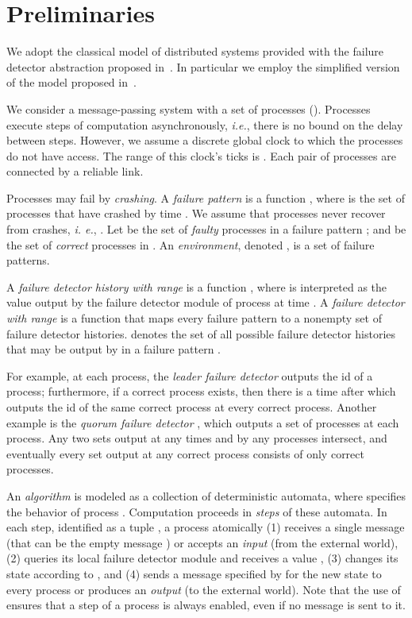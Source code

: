 \documentclass[11pt]{article}
\begin{document}
\section{Preliminaries}
\label{sec:model}


We  adopt the classical model of distributed systems provided with the
failure detector abstraction proposed in~\cite{CT96,CHT96}.
In particular we employ the simplified version of the model proposed in~\cite{GHKT12,JT08}.

We consider a message-passing system  with a set of
	processes  ().
	Processes execute steps of computation asynchronously, {\em i.e.}, there is
	no bound on the delay between steps.
However, we assume a discrete global clock
	to which the processes do not have access.
The range of this clock's ticks is .
Each pair of processes are connected by a reliable link.

Processes may fail by \emph{crashing}.
A \emph{failure pattern} is a function ,
	where  is the set of processes that have crashed by time .
We assume that processes never recover from crashes, \emph{i. e.}, .
Let 
	be the set of \emph{faulty} processes in a failure pattern ;
	and  be
	the set of \emph{correct} processes in .
An \emph{environment}, denoted , is a set of failure patterns.



A \emph{failure detector history  with range } is a function ,
	where  is interpreted as the value output by the failure detector module
	of process  at time .
A \emph{failure detector  with range } is a function
	that maps every failure pattern  to
	a nonempty set of failure detector histories.
 denotes the set of all possible failure detector histories
	that may be output by  in a failure pattern .

For example, at each process, the \emph{leader failure detector}  outputs the id of a process;
	furthermore, if a correct process exists, then there is a time after which
	 outputs the id of the same correct process at every correct process.
Another example is the \emph{quorum failure detector} , which
	outputs a set of processes at each process.
Any two sets output at any times and by any processes intersect, and
	eventually every set output at any correct process
	consists of only correct processes.

An \emph{algorithm}  is modeled as a collection of 
deterministic automata, where  specifies the behavior of
process .
Computation proceeds in \emph{steps} of these automata.
In each step, identified as a tuple , a process  atomically
(1) receives a single message  (that can be the empty message
) or accepts an \emph{input} (from the
external world),
(2)  queries its local failure detector module
	and receives a value , (3) changes its state according to
        , and (4) sends a message
        specified by  for the new state to every process or
        produces an \emph{output} (to the external world).
Note that the use of  ensures that a step of a process is
always enabled, even if no message is sent to it.  	
\end{document}

